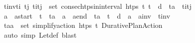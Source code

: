 \begin{isabellebody}
\ {\isacharquery}{\kern0pt}t\isactrlsub i\isactrlsub n\isactrlsub v{\isacharequal}{\kern0pt}{\isachardoublequoteopen}{\isasymexists}t\isactrlsub i\ t\isactrlsub j{\isachardot}{\kern0pt}\ {\isacharparenleft}{\kern0pt}t\isactrlsub i{\isacharcomma}{\kern0pt}t\isactrlsub j{\isacharparenright}{\kern0pt}\ {\isasymin}\ set\ {\isacharparenleft}{\kern0pt}consec{\isacharunderscore}{\kern0pt}htps{\isacharunderscore}{\kern0pt}in{\isacharunderscore}{\kern0pt}interval\ {\isacharquery}{\kern0pt}htps\ t\isactrlsub {\isasympi}\ {\isacharparenleft}{\kern0pt}t\isactrlsub {\isasympi}\ {\isacharplus}{\kern0pt}\ d{\isacharparenright}{\kern0pt}{\isacharparenright}{\kern0pt}\ {\isasymand}\ t\isactrlsub a\ {\isacharequal}{\kern0pt}\ {\isacharparenleft}{\kern0pt}t\isactrlsub i{\isacharplus}{\kern0pt}t\isactrlsub j{\isacharparenright}{\kern0pt}\ {\isacharslash}{\kern0pt}\ {}{\isachardoublequoteclose}\isanewline
\ \ \ \ \isamarkupfalse%
\ {\isachardoublequoteopen}{\isacharparenleft}{\kern0pt}a\ {\isacharequal}{\kern0pt}\ {\isacharquery}{\kern0pt}a\isactrlsub s\isactrlsub t\isactrlsub a\isactrlsub r\isactrlsub t\ {\isasymand}\ t\isactrlsub {\isasympi}\ {\isacharequal}{\kern0pt}\ t\isactrlsub a{\isacharparenright}{\kern0pt}\ {\isasymor}\ {\isacharparenleft}{\kern0pt}a\ {\isacharequal}{\kern0pt}\ {\isacharquery}{\kern0pt}a\isactrlsub e\isactrlsub n\isactrlsub d\ {\isasymand}\ t\isactrlsub a\ {\isacharequal}{\kern0pt}\ t\isactrlsub {\isasympi}\ {\isacharplus}{\kern0pt}\ d{\isacharparenright}{\kern0pt}\ {\isasymor}\ {\isacharparenleft}{\kern0pt}a\ {\isacharequal}{\kern0pt}\ {\isacharquery}{\kern0pt}a\isactrlsub i\isactrlsub n\isactrlsub v\ {\isasymand}\ {\isacharquery}{\kern0pt}t\isactrlsub i\isactrlsub n\isactrlsub v{\isacharparenright}{\kern0pt}{\isachardoublequoteclose}\isanewline
\ \ \ \ \ \ \isamarkupfalse%
\ {\isacartoucheopen}{\isacharparenleft}{\kern0pt}t\isactrlsub a{\isacharcomma}{\kern0pt}a{\isacharparenright}{\kern0pt}\ {\isasymin}\ set\ {\isacharparenleft}{\kern0pt}simplify{\isacharunderscore}{\kern0pt}action\ {\isacharquery}{\kern0pt}htps\ {\isacharparenleft}{\kern0pt}t\isactrlsub {\isasympi}{\isacharcomma}{\kern0pt}{\isasympi}{\isacharparenright}{\kern0pt}{\isacharparenright}{\kern0pt}{\isacartoucheclose}\ Durative{\isacharunderscore}{\kern0pt}Plan{\isacharunderscore}{\kern0pt}Action\isanewline
\ \ \ \ \ \ \isamarkupfalse%
\ {\isacharparenleft}{\kern0pt}auto\ simp{\isacharcolon}{\kern0pt}\ Let{\isacharunderscore}{\kern0pt}def{\isacharparenright}{\kern0pt}\ blast{\isacharplus}{\kern0pt}\isanewline
\ \ \ \ \isamarkupfalse%

\end{isabellebody}
